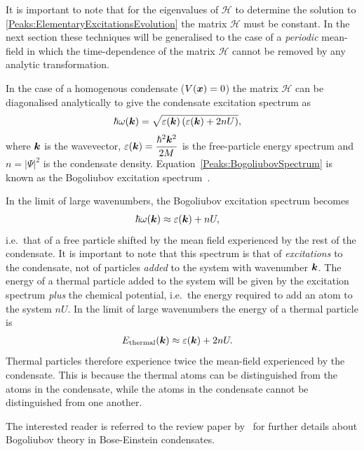 It is important to note that for the eigenvalues of $\mathcal{H}$ to determine the solution to \eqref{Peaks:ElementaryExcitationsEvolution} the matrix $\mathcal{H}$ must be constant. In the next section these techniques will be generalised to the case of a \emph{periodic} mean-field in which the time-dependence of the matrix $\mathcal{H}$ cannot be removed by any analytic transformation.

In the case of a homogenous condensate ($V(\bm{x}) = 0$) the matrix $\mathcal{H}$ can be diagonalised analytically to give the condensate excitation spectrum as
\begin{align}
    \hbar \omega(\vect{k}) &= \sqrt{\varepsilon(\vect{k})\left(\varepsilon(\vect{k}) + 2 n U \right)},
    \label{Peaks:BogoliubovSpectrum}
\end{align}
where $\bm{k}$ is the wavevector, $\displaystyle \varepsilon(\bm{k}) = \frac{\hbar^2 \bm{k}^2}{2 M}$ is the free-particle energy spectrum and $n = \big|\Psi \big|^2$ is the condensate density. Equation~\eqref{Peaks:BogoliubovSpectrum} is known as the Bogoliubov excitation spectrum~\citep{Bogoliubov:1947}.  

In the limit of large wavenumbers, the Bogoliubov excitation spectrum becomes
\begin{align}
    \hbar \omega(\bm{k}) &\approx \varepsilon(\bm{k}) + n U,
\end{align}
i.e.\  that of a free particle shifted by the mean field experienced by the rest of the condensate.  It is important to note that this spectrum is that of \emph{excitations} to the condensate, not of particles \emph{added} to the system with wavenumber $\bm{k}$.  The energy of a thermal particle added to the system will be given by the excitation spectrum \emph{plus} the chemical potential, i.e.\  the energy required to add an atom to the system $n U$.  In the limit of large wavenumbers the energy of a thermal particle is
\begin{align}
    E_\text{thermal}(\vect{k}) &\approx \varepsilon(\vect{k}) + 2 n U.
    \label{Peaks:ThermalParticleEnergySpectrum}
\end{align}
Thermal particles therefore experience twice the mean-field experienced by the condensate.  This is because the thermal atoms can be distinguished from the atoms in the condensate, while the atoms in the condensate cannot be distinguished from one another.

The interested reader is referred to the review paper by~\citet{Ozeri:2005} for further details about Bogoliubov theory in Bose-Einstein condensates.

